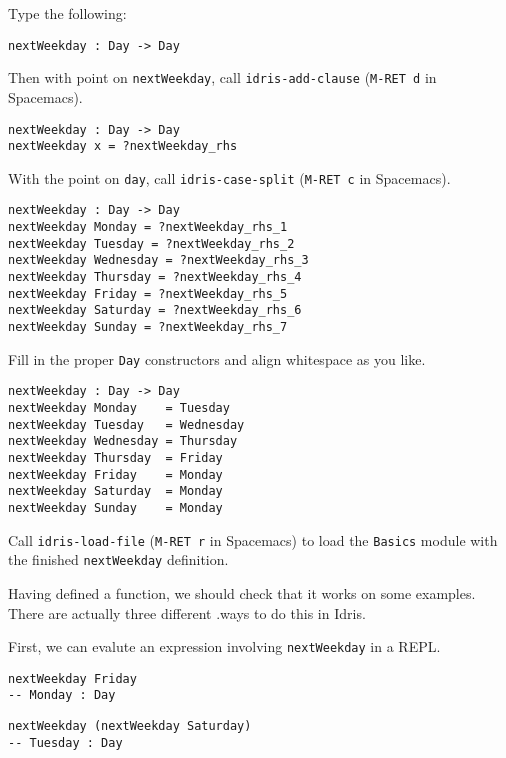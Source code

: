 Type the following:

\begin{verbatim}
nextWeekday : Day -> Day
\end{verbatim}

Then with point on \texttt{nextWeekday}, call
\texttt{idris-add-clause} (\texttt{M-RET d} in
Spacemacs).

\begin{verbatim}
nextWeekday : Day -> Day
nextWeekday x = ?nextWeekday_rhs
\end{verbatim}

With the point on \texttt{day}, call
\texttt{idris-case-split} (\texttt{M-RET c} in
Spacemacs).

\begin{verbatim}
nextWeekday : Day -> Day
nextWeekday Monday = ?nextWeekday_rhs_1
nextWeekday Tuesday = ?nextWeekday_rhs_2
nextWeekday Wednesday = ?nextWeekday_rhs_3
nextWeekday Thursday = ?nextWeekday_rhs_4
nextWeekday Friday = ?nextWeekday_rhs_5
nextWeekday Saturday = ?nextWeekday_rhs_6
nextWeekday Sunday = ?nextWeekday_rhs_7
\end{verbatim}

Fill in the proper \texttt{Day} constructors and align
whitespace as you like.

\begin{verbatim}
nextWeekday : Day -> Day
nextWeekday Monday    = Tuesday
nextWeekday Tuesday   = Wednesday
nextWeekday Wednesday = Thursday
nextWeekday Thursday  = Friday
nextWeekday Friday    = Monday
nextWeekday Saturday  = Monday
nextWeekday Sunday    = Monday
\end{verbatim}

Call \texttt{idris-load-file}
(\texttt{M-RET r} in Spacemacs) to load the
\texttt{Basics} module with the finished
\texttt{nextWeekday} definition.

Having defined a function, we should check that it works on some
examples. There are actually three different .ways to do this in Idris.

First, we can evalute an expression involving
\texttt{nextWeekday} in a REPL.

\begin{verbatim}
nextWeekday Friday
-- Monday : Day
\end{verbatim}

\begin{verbatim}
nextWeekday (nextWeekday Saturday)
-- Tuesday : Day
\end{verbatim}

